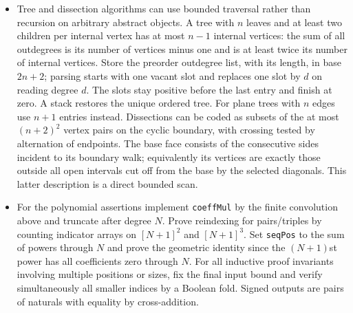 \begin{itemize}
Dyck words indexed by $j$. For the partition bijection, a stack of at most
$n$ pairs (block ID, vacancies) is maintained; prefix induction verifies
that total vacancies equal opens minus closes and that finished blocks
never receive another element.
\item Tree and dissection algorithms can use bounded traversal rather than
recursion on arbitrary abstract objects. A tree with $n$ leaves and at
least two children per internal vertex has at most $n-1$ internal vertices:
the sum of all outdegrees is its number of vertices minus one and is at
least twice its number of internal vertices. Store the preorder outdegree
list, with its length, in base $2n+2$; parsing starts with one vacant
slot and replaces one slot by $d$ on reading degree $d$. The slots stay
positive before the last entry and finish at zero. A stack restores the
unique ordered tree. For plane trees with $n$ edges use $n+1$ entries
instead. Dissections can be coded as subsets of the at most $(n+2)^2$
vertex pairs on the cyclic boundary, with crossing tested by alternation
of endpoints. The base face consists of the consecutive sides incident
to its boundary walk; equivalently its vertices are exactly those outside
all open intervals cut off from the base by the selected diagonals.
This latter description is a direct bounded scan.
\item For the polynomial assertions implement \texttt{coeffMul} by the
finite convolution above and truncate after degree $N$. Prove reindexing
for pairs/triples by counting indicator arrays on $[N+1]^2$ and
$[N+1]^3$. Set \texttt{seqPos} to the sum of powers through $N$ and
prove the geometric identity since the $(N+1)$st power has all
coefficients zero through $N$. For all inductive proof invariants involving
multiple positions or sizes, fix the final input bound and verify
simultaneously all smaller indices by a Boolean fold. Signed outputs are
pairs of naturals with equality by cross-addition.
\end{itemize}
